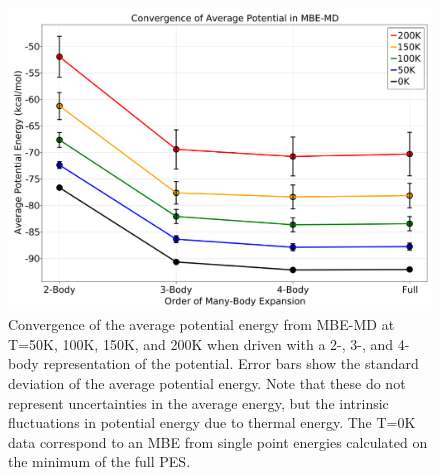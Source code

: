 \begin{figure}[h]
\uwsinglespace
\begin{center}
\begin{minipage}{0.8\textwidth}
\includegraphics[width=\textwidth]{Figures/Chapter_4/ch4_figure_3.png}
\end{minipage}
\end{center}
\caption[Convergence of the average potential energy from MBE-MD at T=50K, 100K, 150K, and 200K when driven with a 2-, 3-, and 4-body representation of the potential. Error bars show the standard deviation of the average potential energy. Note that these do not represent uncertainties in the average energy, but the intrinsic fluctuations in potential energy due to thermal energy. The T=0K data correspond to an MBE from single point energies calculated on the minimum of the full PES.]{Convergence of the average potential energy from MBE-MD at T=50K, 100K, 150K, and 200K when driven with a 2-, 3-, and 4-body representation of the potential. Error bars show the standard deviation of the average potential energy. Note that these do not represent uncertainties in the average energy, but the intrinsic fluctuations in potential energy due to thermal energy. The T=0K data correspond to an MBE from single point energies calculated on the minimum of the full PES.}
\label{fig:MBE_MD_F3}
\end{figure}